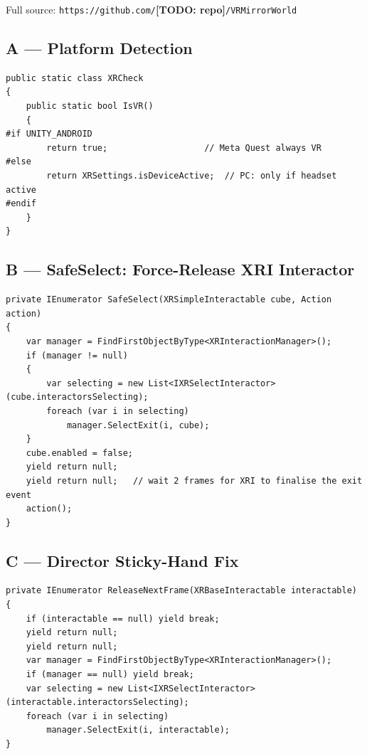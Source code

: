 \documentclass[12pt,a4paper]{article}
\newcommand{\todo}[1]{\textcolor{red!70!black}{\textbf{[TODO: #1]}}}
\begin{document}
Full source: \texttt{https://github.com/}\todo{repo}\texttt{/VRMirrorWorld}

\subsection*{A — Platform Detection}

\begin{lstlisting}[caption={XRCheck.cs — centralised VR/desktop detection.}]
public static class XRCheck
{
    public static bool IsVR()
    {
#if UNITY_ANDROID
        return true;                   // Meta Quest always VR
#else
        return XRSettings.isDeviceActive;  // PC: only if headset active
#endif
    }
}
\end{lstlisting}

\subsection*{B — SafeSelect: Force-Release XRI Interactor}

\begin{lstlisting}[caption={SafeSelect coroutine (LobbyConnectionPanel / VRRoleMenu).}]
private IEnumerator SafeSelect(XRSimpleInteractable cube, Action action)
{
    var manager = FindFirstObjectByType<XRInteractionManager>();
    if (manager != null)
    {
        var selecting = new List<IXRSelectInteractor>(cube.interactorsSelecting);
        foreach (var i in selecting)
            manager.SelectExit(i, cube);
    }
    cube.enabled = false;
    yield return null;
    yield return null;   // wait 2 frames for XRI to finalise the exit event
    action();
}
\end{lstlisting}

\subsection*{C — Director Sticky-Hand Fix}

\begin{lstlisting}[caption={XRDirectorInteractor.cs — force-release after button/lever press.}]
private IEnumerator ReleaseNextFrame(XRBaseInteractable interactable)
{
    if (interactable == null) yield break;
    yield return null;
    yield return null;
    var manager = FindFirstObjectByType<XRInteractionManager>();
    if (manager == null) yield break;
    var selecting = new List<IXRSelectInteractor>(interactable.interactorsSelecting);
    foreach (var i in selecting)
        manager.SelectExit(i, interactable);
}
\end{lstlisting}
\end{document}
